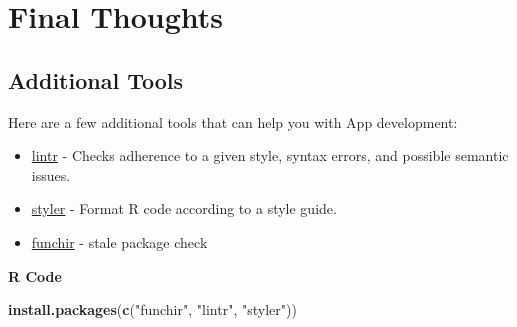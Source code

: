\documentclass[
]{book}
\newenvironment{Shaded}{\begin{snugshade}}{\end{snugshade}}
\newcommand{\KeywordTok}[1]{\textcolor[rgb]{0.13,0.29,0.53}{\textbf{#1}}}
\newcommand{\NormalTok}[1]{#1}
\newcommand{\StringTok}[1]{\textcolor[rgb]{0.31,0.60,0.02}{#1}}
\providecommand{\tightlist}{%
  \setlength{\itemsep}{0pt}\setlength{\parskip}{0pt}}
\begin{document}
\hypertarget{part-final-thoughts}{%
\part{Final Thoughts}\label{part-final-thoughts}}

\hypertarget{addTools}{%
\chapter{Additional Tools}\label{addTools}}

Here are a few additional tools that can help you with App development:

\begin{itemize}
\tightlist
\item
  \href{https://github.com/jimhester/lintr}{lintr} - Checks adherence to a
  given style, syntax errors, and possible semantic issues.
\item
  \href{https://www.tidyverse.org/articles/2017/12/styler-1.0.0/}{styler} -
  Format R code according to a style guide.
\item
  \href{https://github.com/MichaelChirico/funchir}{funchir} - stale package
  check
\end{itemize}

\textbf{R Code}

\begin{Shaded}
\begin{Highlighting}[]
\KeywordTok{install.packages}\NormalTok{(}\KeywordTok{c}\NormalTok{(}\StringTok{"funchir"}\NormalTok{, }\StringTok{"lintr"}\NormalTok{, }\StringTok{"styler"}\NormalTok{))}
\end{Highlighting}
\end{Shaded}

  
\end{document}
